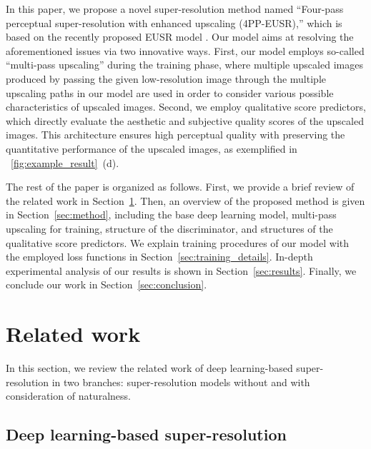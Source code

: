 \documentclass[runningheads]{llncs}
\begin{document}
In this paper, we propose a novel super-resolution method named ``Four-pass perceptual super-resolution with enhanced upscaling (4PP-EUSR),'' which is based on the recently proposed EUSR model \cite{kim2018deep}.
Our model aims at resolving the aforementioned issues via two innovative ways.
First, our model employs so-called ``multi-pass upscaling'' during the training phase, where multiple upscaled images produced by passing the given low-resolution image through the multiple upscaling paths in our model are used in order to consider various possible characteristics of upscaled images.
Second, we employ qualitative score predictors, which directly evaluate the aesthetic and subjective quality scores of the upscaled images.
This architecture ensures high perceptual quality with preserving the quantitative performance of the upscaled images, as exemplified in \figurename~\ref{fig:example_result}~(d).

The rest of the paper is organized as follows.
First, we provide a brief review of the related work in Section~\ref{sec:related_work}.
Then, an overview of the proposed method is given in Section~\ref{sec:method}, including the base deep learning model, multi-pass upscaling for training, structure of the discriminator, and structures of the qualitative score predictors.
We explain training procedures of our model with the employed loss functions in Section~\ref{sec:training_details}.
In-depth experimental analysis of our results is shown in Section~\ref{sec:results}.
Finally, we conclude our work in Section~\ref{sec:conclusion}.


\section{Related work}
\label{sec:related_work}

In this section, we review the related work of deep learning-based super-resolution in two branches: super-resolution models without and with consideration of naturalness.

\subsection{Deep learning-based super-resolution}
\end{document}
